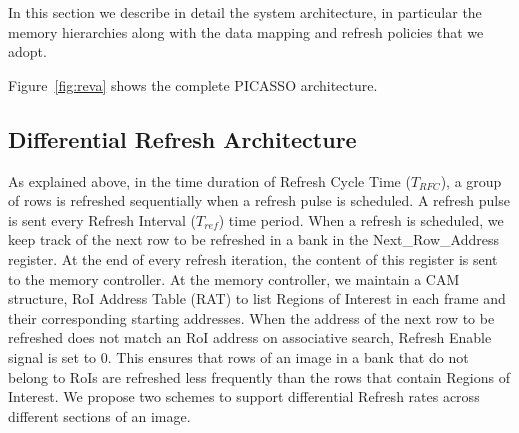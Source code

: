 In this section we describe in detail the system architecture, in particular the memory hierarchies along with the data mapping and refresh policies that we adopt.

Figure~\ref{fig:reva} shows the complete PICASSO architecture.

\begin{figure*}[ht!]
\begin{minipage}[b]{0.33\linewidth}
\raggedleft
{}
\caption{\label{fig:reva}a) Architecture of Proposed System}
\end{minipage}
\begin{minipage}[b]{0.35\linewidth}
\centering
{}
\caption{\label{fig:reva}b) Architecture of Proposed System}
\end{minipage}
\begin{minipage}[b]{0.3\linewidth}
\raggedright
{}
\caption{\label{fig:reva}c) Architecture of Proposed System}
\end{minipage}
\end{figure*}

\subsection{Differential Refresh Architecture}
As explained above, in the time duration of Refresh Cycle Time ($T_{RFC}$), a group of rows is refreshed sequentially when a refresh pulse is scheduled. A refresh pulse is sent every Refresh Interval ($T_{ref}$) time period.  When a refresh is scheduled, we keep track of the next row to be refreshed in a bank in the Next\_Row\_Address register. At the end of every refresh iteration, the content of this register is sent to the memory controller. At the memory controller, we maintain a CAM structure, RoI Address Table (RAT) to list Regions of Interest in each frame and their corresponding starting addresses. When the address of the next row to be refreshed does not match an RoI address on associative search, Refresh Enable signal is set to 0. This ensures that rows of an image in a bank that do not belong to RoIs are refreshed less frequently than the rows that contain Regions of Interest. We propose two schemes to support differential Refresh rates across different sections of an image. 

